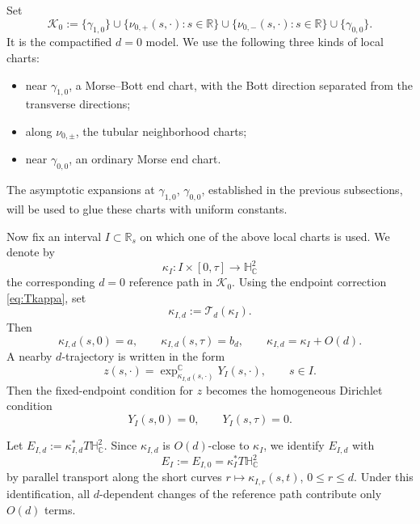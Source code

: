 \documentclass[11pt]{amsart}
\theoremstyle{plain}
\theoremstyle{definition}
\newcommand{\R}{\mathbb{R}}
\newcommand{\C}{\mathbb{C}}
\newcommand{\HH}{\mathbb{H}}
\begin{document}
\smallskip
Set
\[
\mathcal{K}_0:=\{\gamma_{1,0}\}\cup
\{\nu_{0,+}(s,\cdot):s\in \R\}\cup
\{\nu_{0,-}(s,\cdot):s\in \R\}\cup
\{\gamma_{0,0}\}.
\]
It is the compactified $d=0$ model. We use the following three kinds of local charts:
\begin{itemize}
\item[(a)] near $\gamma_{1,0}$, a Morse--Bott end chart, with the Bott direction separated from the transverse directions;
\item[(b)] along $\nu_{0,\pm}$, the tubular neighborhood charts;
\item[(c)] near $\gamma_{0,0}$, an ordinary Morse end chart.
\end{itemize}
The asymptotic expansions at $\gamma_{1,0}$, $\gamma_{0,0}$, established in the previous
subsections, will be used to glue these charts with uniform constants.

Now fix an interval $I\subset\R_s$ on which one of the above local
charts is used. We denote by
\[
\kappa_I:I\times[0,\tau]\longrightarrow \HH^2_{\C}
\]
the corresponding $d=0$ reference path in $\mathcal{K}_0$. Using the endpoint correction \eqref{eq:Tkappa}, set
\[
\kappa_{I,d}:=\mathcal T_d(\kappa_I).
\]
Then
\[
\kappa_{I,d}(s,0)=a,\qquad
\kappa_{I,d}(s,\tau)=b_d,\qquad
\kappa_{I,d}=\kappa_I+O(d).
\]
A nearby $d$-trajectory is written in the form
\[
z(s,\cdot)=\exp_{\kappa_{I,d}(s,\cdot)}^{\C}Y_I(s,\cdot),\qquad s\in I.
\]
Then the fixed-endpoint condition for $z$ becomes the
homogeneous Dirichlet condition
\[
Y_I(s,0)=0,\qquad Y_I(s,\tau)=0.
\]

Let $E_{I,d}:=\kappa_{I,d}^{*}T\HH^2_{\C}$. Since $\kappa_{I,d}$ is $O(d)$-close to $\kappa_I$, we identify
$E_{I,d}$ with
\[
E_I:=E_{I,0}=\kappa_I^{*}T\HH^2_{\C}
\]
by parallel transport along the short curves
$r\mapsto \kappa_{I,r}(s,t)$, $0\le r\le d$. Under this identification,
all $d$-dependent changes of the reference path contribute only $O(d)$
terms. %
\end{document}
